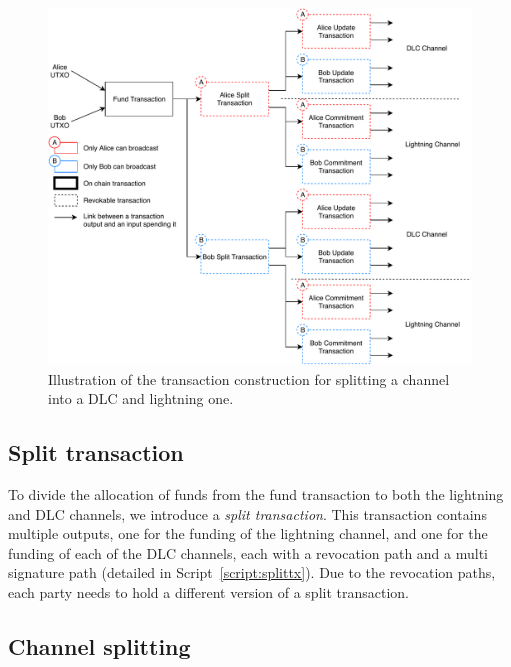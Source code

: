 \begin{figure}
  \centering
  \includegraphics[width=\textwidth]{Figures/LightningIntegration.pdf}
  \caption{Illustration of the transaction construction for splitting a channel into a DLC and lightning one.}
  \label{fig:lnin}
\end{figure}

\subsection{Split transaction}

To divide the allocation of funds from the fund transaction to both the lightning and DLC channels, we introduce a \emph{split transaction}.
This transaction contains multiple outputs, one for the funding of the lightning channel, and one for the funding of each of the DLC channels, each with a revocation path and a multi signature path (detailed in Script~\ref{script:splittx}).
Due to the revocation paths, each party needs to hold a different version of a split transaction.

\subsection{Channel splitting}

